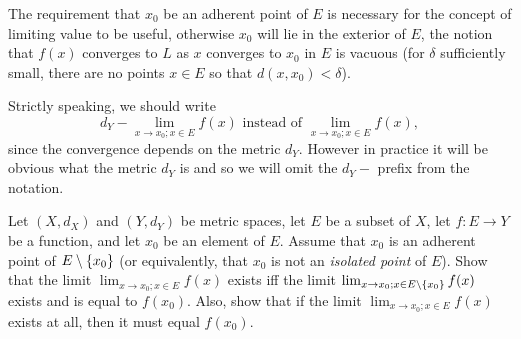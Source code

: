 \begin{rmk}\label{ii:3.1.7}
  The requirement that \(x_0\) be an adherent point of \(E\) is necessary for the concept of limiting value to be useful, otherwise \(x_0\) will lie in the exterior of \(E\), the notion that \(f(x)\) converges to \(L\) as \(x\) converges to \(x_0\) in \(E\) is vacuous
  (for \(\delta\) sufficiently small, there are no points \(x \in E\) so that \(d(x, x_0) < \delta\)).
\end{rmk}

\begin{rmk}\label{ii:3.1.8}
  Strictly speaking, we should write
  \[
    d_Y - \lim_{x \to x_0 ; x \in E} f(x) \text{ instead of } \lim_{x \to x_0 ; x \in E} f(x),
  \]
  since the convergence depends on the metric \(d_Y\).
  However in practice it will be obvious what the metric \(d_Y\) is and so we will omit the \(d_Y -\) prefix from the notation.
\end{rmk}

\exercisesection

\begin{ex}\label{ii:ex:3.1.1}
  Let \((X, d_X)\) and \((Y, d_Y)\) be metric spaces, let \(E\) be a subset of \(X\), let \(f : E \to Y\) be a function, and let \(x_0\) be an element of \(E\).
  Assume that \(x_0\) is an adherent point of \(E \setminus \left\lbrace x_0\right\rbrace\)
  (or equivalently, that \(x_0\) is not an \emph{isolated point} of \(E\)).
  Show that the limit \(\lim_{x \to x_0 ; x \in E} f(x)\) exists iff the limit \(\lim_{x \to x_0 ; x \in E \setminus \left\lbrace x_0\right\rbrace} f(x)\) exists and is equal to \(f(x_0)\).
  Also, show that if the limit \(\lim_{x \to x_0 ; x \in E} f(x)\) exists at all, then it must equal \(f(x_0)\).
\end{ex}

